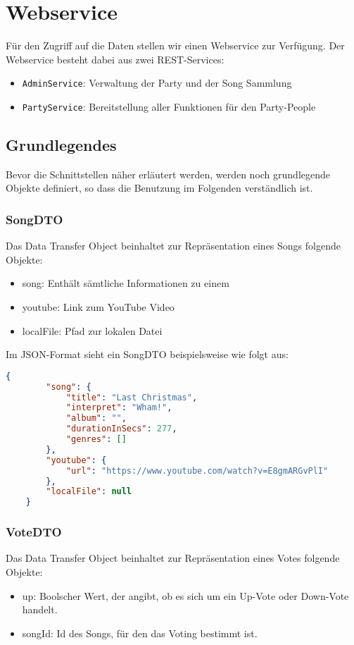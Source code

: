 \section{Webservice}
\label{cha:Webservice}
Für den Zugriff auf die Daten stellen wir einen Webservice zur Verfügung.
Der Webservice besteht dabei aus zwei REST-Services:
\begin{itemize}
\item \texttt{AdminService}: Verwaltung der Party und der Song Sammlung
\item \texttt{PartyService}: Bereitstellung aller Funktionen für den Party-People
\end{itemize}


\subsection{Grundlegendes}
Bevor die Schnittstellen näher erläutert werden, werden noch grundlegende Objekte definiert, so dass die Benutzung im Folgenden verständlich ist.

\subsubsection{SongDTO}
\label{object:SongDTO}
Das Data Transfer Object beinhaltet zur Repräsentation eines Songs folgende Objekte:
\begin{itemize}
\item song: Enthält sämtliche Informationen zu einem 
\item{youtube: Link zum YouTube Video}
\item{localFile: Pfad zur lokalen Datei}
\end{itemize}

Im JSON-Format sieht ein SongDTO beispielsweise wie folgt aus:

\begin{lstlisting}[language=json]
    {
        "song": {
            "title": "Last Christmas",
            "interpret": "Wham!",
            "album": "",
            "durationInSecs": 277,
            "genres": []
        },
        "youtube": {
            "url": "https://www.youtube.com/watch?v=E8gmARGvPlI"
        },
        "localFile": null
    }
\end{lstlisting}

\subsubsection{VoteDTO}
\label{object:VoteDTO}
Das Data Transfer Object beinhaltet zur Repräsentation eines Votes folgende Objekte:
\begin{itemize}
\item{up: Boolscher Wert, der angibt, ob es sich um ein Up-Vote oder Down-Vote handelt.}
\item{songId: Id des Songs, für den das Voting bestimmt ist.}
\end{itemize}

